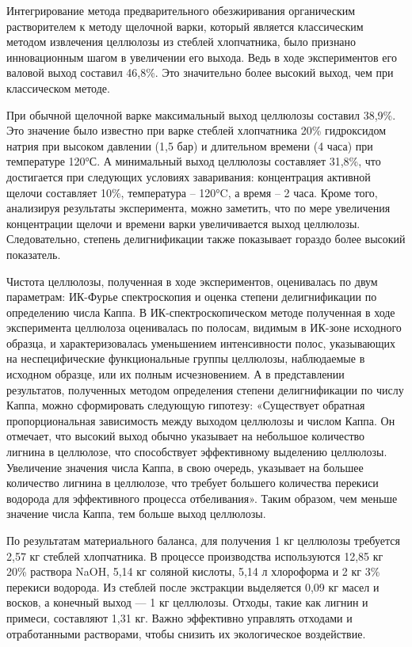 Интегрирование метода предварительного обезжиривания органическим
растворителем к методу щелочной варки, который является классическим
методом извлечения целлюлозы из стеблей хлопчатника, было признано
инновационным шагом в увеличении его выхода. Ведь в ходе экспериментов
его валовой выход составил 46,8\%. Это значительно более высокий выход,
чем при классическом методе.

При обычной щелочной варке максимальный выход целлюлозы составил 38,9\%.
Это значение было известно при варке стеблей хлопчатника 20\%
гидроксидом натрия при высоком давлении (1,5 бар) и длительном времени
(4 часа) при температуре 120°С. А минимальный выход целлюлозы составляет
31,8\%, что достигается при следующих условиях заваривания: концентрация
активной щелочи составляет 10\%, температура -- 120°C, а время -- 2
часа. Кроме того, анализируя результаты эксперимента, можно заметить,
что по мере увеличения концентрации щелочи и времени варки увеличивается
выход целлюлозы. Следовательно, степень делигнификации также показывает
гораздо более высокий показатель.

Чистота целлюлозы, полученная в ходе экспериментов, оценивалась по двум
параметрам: ИК-Фурье спектроскопия и оценка степени делигнификации по
определению числа Каппа. В ИК-спектроскопическом методе полученная в
ходе эксперимента целлюлоза оценивалась по полосам, видимым в ИК-зоне
исходного образца, и характеризовалась уменьшением интенсивности полос,
указывающих на неспецифические функциональные группы целлюлозы,
наблюдаемые в исходном образце, или их полным исчезновением. А в
представлении результатов, полученных методом определения степени
делигнификации по числу Каппа, можно сформировать следующую гипотезу:
«Существует обратная пропорциональная зависимость между выходом
целлюлозы и числом Каппа. Он отмечает, что высокий выход обычно
указывает на небольшое количество лигнина в целлюлозе, что способствует
эффективному выделению целлюлозы. Увеличение значения числа Каппа, в
свою очередь, указывает на большее количество лигнина в целлюлозе, что
требует большего количества перекиси водорода для эффективного процесса
отбеливания». Таким образом, чем меньше значение числа Каппа, тем больше
выход целлюлозы.

По результатам материального баланса, для получения 1 кг целлюлозы
требуется 2,57 кг стеблей хлопчатника. В процессе производства
используются 12,85 кг 20\% раствора NaOH, 5,14 кг соляной кислоты, 5,14
л хлороформа и 2 кг 3\% перекиси водорода. Из стеблей после экстракции
выделяется 0,09 кг масел и восков, а конечный выход --- 1 кг целлюлозы.
Отходы, такие как лигнин и примеси, составляют 1,31 кг. Важно эффективно
управлять отходами и отработанными растворами, чтобы снизить их
экологическое воздействие.

